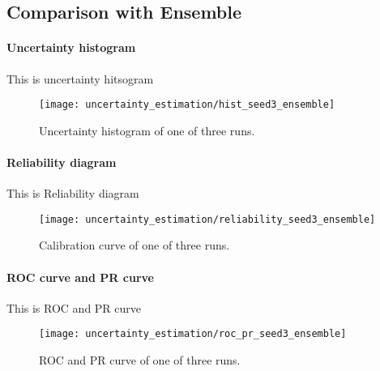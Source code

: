 \subsection{Comparison with Ensemble}

\paragraph{Uncertainty histogram}
This is uncertainty hitsogram
\begin{figure}[H]
	\begin{center}
		\texttt{[image: uncertainty\_estimation/hist\_seed3\_ensemble]}
		\caption{Uncertainty histogram of one of three runs.}		
		\label{exp1_reliability}
	\end{center}
\end{figure}
\paragraph{Reliability diagram}
This is Reliability diagram
\begin{figure}[H]
	\begin{center}
		\texttt{[image: uncertainty\_estimation/reliability\_seed3\_ensemble]}
		\caption{Calibration curve of one of three runs.}		
		\label{exp1_reliability}
	\end{center}
\end{figure}

\paragraph{ROC curve and PR curve}
This is ROC and PR curve
\begin{figure}[H]
	\begin{center}
		\texttt{[image: uncertainty\_estimation/roc\_pr\_seed3\_ensemble]}
		\caption{ROC and PR curve of one of three runs.}		
		\label{exp1_reliability}
	\end{center}
\end{figure}

